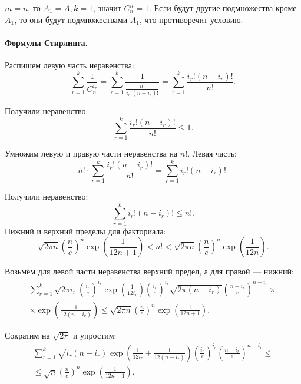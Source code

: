 \documentclass{book}
\begin{document}
$ m = n $, то $ A_1 = A, k = 1 $, значит $C_n^n = 1$.
Если будут другие подмножества кроме $A_1$, то они будут подмножествами $A_1$, что противоречит условию.

\paragraph*{Формулы Стирлинга.}

Распишем левую часть неравенства:
$$ \sum \limits_{r=1}^k \frac{1}{C_n^{i_r}} =
\sum \limits_{r=1}^k \frac{1}{ \frac{n!}{i_{r}! \left(n-i_r\right)!} } =
\sum \limits_{r=1}^k \frac{i_{r}! \left(n-i_r\right)!}{n!}.$$

Получили неравенство:
$$\sum \limits_{r=1}^k \frac{i_{r}! \left(n-i_r\right)!}{n!} \leq 1.$$

Умножим левую и правую части неравенства на $n!$.
Левая часть:
$$ n! \cdot \sum \limits_{r=1}^k \frac{i_{r}! \left(n-i_r\right)!}{n!} =
\sum \limits_{r=1}^k i_{r}! \left(n-i_r\right)!.$$

Получили неравенство:
$$\sum \limits_{r=1}^k i_{r}! \left(n-i_r\right)! \leq n!. $$
Нижний и верхний пределы для факториала:
$$ \sqrt{2 \pi n} \left( \frac{n}{e} \right)^n \exp \left( \frac{1}{12 n+1} \right) <
n! <
\sqrt{2 \pi n} \left( \frac{n}{e} \right)^n \exp \left( \frac{1}{12 n} \right). $$

Возьмём для левой части неравенства верхний предел, а для правой --- нижний:
\begin{equation*}
\begin{split}
\sum \limits_{r=1}^k \sqrt{2 \pi i_r} \left( \frac{i_r}{e} \right)^{i_r} \exp \left( \frac{1}{12 i_r} \right)
\left( \frac{i_r}{e} \right)^{i_r} \sqrt{2 \pi  \left( n-i_r\right) }
\left( \frac{n-i_r}{e} \right)^{n-i_r} \times \\
\times \exp \left( \frac{1}{12 \left( n-i_r\right) } \right) \leq 
\sqrt{2 \pi n} \left( \frac{n}{e} \right)^n \exp \left( \frac{1}{12 n+1} \right).
\end{split}
\end{equation*}

Сократим на $ \sqrt{2 \pi } $ и упростим:
\begin{equation*}
\begin{split}
\sum \limits_{r=1}^k \sqrt{i_r \left( n-i_r \right) }
\exp \left( \frac{1}{12 i_r} + \frac{1}{12 \left( n-i_r \right) } \right) \left( \frac{i_r}{e} \right)^{i_r}
\left( \frac{n-i_r}{e} \right)^{n-i_r} \leq \\
\leq \sqrt{n} \left( \frac{n}{e} \right)^n \exp \left( \frac{1}{12 n+1} \right).
\end{split}
\end{equation*}
\end{document}
